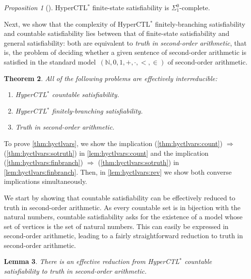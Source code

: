 \documentclass[dvipsnames,10pt,a4paper]{amsart}
\newtheorem{thm}{Theorem}[section]
\newtheorem{lem}[thm]{Lemma}
\theoremstyle{definition}
\theoremstyle{remark}
\newtheorem{propC}[thm]{Proposition}
\newcommand{\nats}{\mathbb{N}}
\newcommand{\hyctlstar}{{HyperCTL$^*$}\xspace}
\begin{document}
\begin{propC}[\cite{FinkbeinerRS15,FinkbeinerH16}]
\hyctlstar finite-state satisfiability is $\Sigma_1^0$-complete.
\end{propC}

Next, we show that the complexity of \hyctlstar finitely-branching satisfiability
and countable satisfiability lies between that of finite-state satisfiability
and general satisfiability:
both are equivalent to \emph{truth in second-order arithmetic}, that is,
the problem of deciding whether a given sentence of second-order arithmetic is satisfied
in the standard model~$(\nats, 0,1,+,\cdot, <,\in)$ of second-order arithmetic.


\begin{thm}\label{thm:hyctlvars}
All of the following problems are effectively interreducible:
  \begin{enumerate}
  \item\label{thm:hyctlvars:count} \hyctlstar countable satisfiability.
  \item\label{thm:hyctlvars:finbranch} \hyctlstar finitely-branching satisfiability.
  \item\label{thm:hyctlvars:sotruth} Truth in second-order arithmetic.
  \end{enumerate}
\end{thm}



To prove \autoref{thm:hyctlvars}, we show the implication (\ref{thm:hyctlvars:count}) $\Rightarrow$ (\ref{thm:hyctlvars:sotruth}) in \autoref{lem:hyctlvars:count} and the  implication (\ref{thm:hyctlvars:finbranch}) $\Rightarrow$ (\ref{thm:hyctlvars:sotruth}) in \autoref{lem:hyctlvars:finbranch}.
Then, in \autoref{lem:hyctlvars:rev} we show both converse implications simultaneously. 

We start by showing that countable satisfiability can be effectively reduced to truth in second-order arithmetic.
As every countable set is in bijection with the natural numbers, countable satisfiability asks for the existence of a model whose set of vertices is the set of natural numbers. 
This can easily be expressed in second-order arithmetic, leading to a fairly
straightforward reduction to truth in second-order arithmetic.

\begin{lem}\label{lem:hyctlvars:count}
There is an effective reduction from \hyctlstar countable
  satisfiability to truth in second-order arithmetic.
\end{lem}
\end{document}
